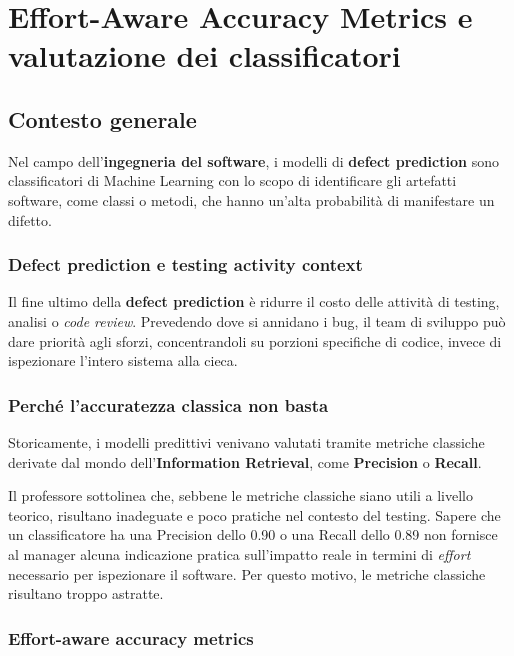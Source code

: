 \chapter{Effort-Aware Accuracy Metrics e valutazione dei classificatori}

\section{Contesto generale}

Nel campo dell'\textbf{ingegneria del software}, i modelli di \textbf{defect prediction} sono classificatori di Machine Learning con lo scopo di identificare gli artefatti software, come classi o metodi, che hanno un'alta probabilità di manifestare un difetto.

\subsection{Defect prediction e testing activity context}

Il fine ultimo della \textbf{defect prediction} è ridurre il costo delle attività di testing, analisi o \emph{code review}. Prevedendo dove si annidano i bug, il team di sviluppo può dare priorità agli sforzi, concentrandoli su porzioni specifiche di codice, invece di ispezionare l'intero sistema alla cieca.

\subsection{Perché l'accuratezza classica non basta}

Storicamente, i modelli predittivi venivano valutati tramite metriche classiche derivate dal mondo dell'\textbf{Information Retrieval}, come \textbf{Precision} o \textbf{Recall}.

\begin{notaprof}
Il professore sottolinea che, sebbene le metriche classiche siano utili a livello teorico, risultano inadeguate e poco pratiche nel contesto del testing. Sapere che un classificatore ha una Precision dello 0.90 o una Recall dello 0.89 non fornisce al manager alcuna indicazione pratica sull'impatto reale in termini di \emph{effort} necessario per ispezionare il software. Per questo motivo, le metriche classiche risultano troppo astratte.
\end{notaprof}

\subsection{Effort-aware accuracy metrics}

